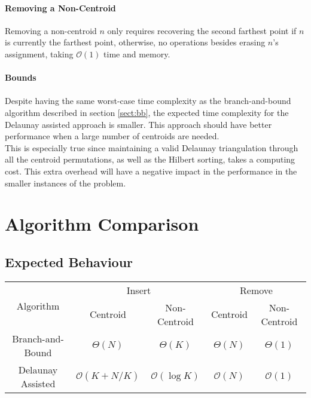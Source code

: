 \paragraph{Removing a Non-Centroid}
Removing a non-centroid $n$ only requires recovering the second farthest point if $n$ is currently the farthest point, otherwise, no operations besides erasing $n$'s assignment, taking $\mathcal{O}(1)$ time and memory.
\paragraph{Bounds}

\paragraph{}
Despite having the same worst-case time complexity as the branch-and-bound algorithm described in section \ref{sect:bb}, the expected time complexity for the Delaunay assisted approach is smaller. This approach should have better performance when a large number of centroids are needed.\\
This is especially true since maintaining a valid Delaunay triangulation through all the centroid permutations, as well as the Hilbert sorting, takes a computing cost. This extra overhead will have a negative impact in the performance in the smaller instances of the problem.\\

\section{Algorithm Comparison}

\subsection{Expected Behaviour}

\begin{center}
\begin{tabular}{|c|c|c|c|c|}
	\hline
	\multirow{2}{*}{Algorithm}	& \multicolumn{2}{c|}{Insert}	& \multicolumn{2}{c|}{Remove}	\\ \cline{2-5}
								& Centroid		& Non-Centroid	& Centroid		& Non-Centroid	\\ \hline
		Branch-and-Bound		& $\Theta(N)$ & $\Theta(K)$ 
									& $\Theta(N)$ & $\Theta(1)$ \\ \hline
		Delaunay Assisted		& $\mathcal{O}(K+N/K)$& $\mathcal{O}(\log{K})$
									& $\mathcal{O}(N)$ & $\mathcal{O}(1)$\\ \hline
\end{tabular}
\end{center}

